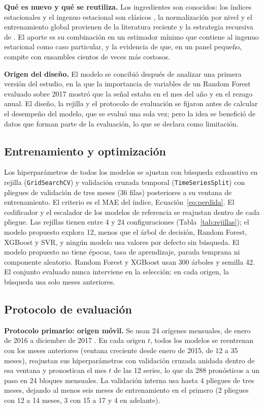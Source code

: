 \documentclass[pdflatex,sn-mathphys-num]{sn-jnl}
\begin{document}
\textbf{Qué es nuevo y qué se reutiliza.} Los ingredientes son conocidos: los índices estacionales y el ingenuo estacional son clásicos \cite{hyndman2021}, la normalización por nivel y el entrenamiento global provienen de la literatura reciente \cite{salinas2020,monteromanso2021} y la estrategia recursiva de \cite{taieb2012}. El aporte es su combinación en un estimador mínimo que contiene al ingenuo estacional como caso particular, y la evidencia de que, en un panel pequeño, compite con ensambles cientos de veces más costosos.

\textbf{Origen del diseño.} El modelo se concibió después de analizar una primera versión del estudio, en la que la importancia de variables de un Random Forest evaluado sobre 2017 mostró que la señal estaba en el mes del año y en el rezago anual. El diseño, la rejilla y el protocolo de evaluación se fijaron antes de calcular el desempeño del modelo, que se evaluó una sola vez; pero la idea se benefició de datos que forman parte de la evaluación, lo que se declara como limitación.

\subsection{Entrenamiento y optimización}\label{subsec:entrenamiento}

Los hiperparámetros de todos los modelos se ajustan con búsqueda exhaustiva en rejilla (\texttt{GridSearchCV}) y validación cruzada temporal (\texttt{TimeSeriesSplit}) con pliegues de validación de tres meses (36 filas) posteriores a su ventana de entrenamiento. El criterio es el MAE del índice, Ecuación~\eqref{eq:perdida}. El codificador y el escalador de los modelos de referencia se reajustan dentro de cada pliegue. Las rejillas tienen entre 4 y 24 configuraciones (Tabla~\ref{tab:rejillas}); el modelo propuesto explora 12, menos que el árbol de decisión, Random Forest, XGBoost y SVR, y ningún modelo usa valores por defecto sin búsqueda. El modelo propuesto no tiene épocas, tasa de aprendizaje, parada temprana ni componente aleatorio. Random Forest y XGBoost usan 300 árboles y semilla 42. El conjunto evaluado nunca interviene en la selección: en cada origen, la búsqueda usa solo meses anteriores.

\subsection{Protocolo de evaluación}\label{subsec:evaluacion}

\textbf{Protocolo primario: origen móvil.} Se usan 24 orígenes mensuales, de enero de 2016 a diciembre de 2017 \cite{cerqueira2020}. En cada origen $t$, todos los modelos se reentrenan con los meses anteriores (ventana creciente desde enero de 2015, de 12 a 35 meses), reajustan sus hiperparámetros con validación cruzada anidada dentro de esa ventana y pronostican el mes $t$ de las 12 series, lo que da 288 pronósticos a un paso en 24 bloques mensuales. La validación interna usa hasta 4 pliegues de tres meses, dejando al menos seis meses de entrenamiento en el primero (2 pliegues con 12 a 14 meses, 3 con 15 a 17 y 4 en adelante).
\end{document}
